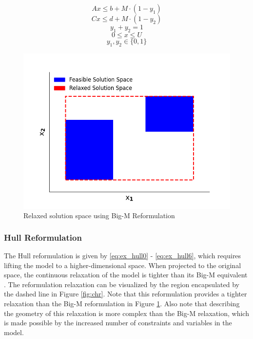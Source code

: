 \documentclass{juliacon}
\begin{document}
\begin{equation}
    \label{eq:ex_bigm1}
    Ax \leq b + M \cdot (1 - y_1)
\end{equation}
\begin{equation}
    \label{eq:ex_bigm2}
    Cx \leq d + M \cdot (1 - y_2)
\end{equation}
\begin{equation}
    \label{eq:ex_bigm3}
    y_1 + y_2 = 1
\end{equation}
\begin{equation}
    \label{eq:ex_bigm4}
    0 \leq x \leq U
\end{equation}
\begin{equation}
    \label{eq:ex_bigm5}
    y_1, y_2 \in \{0,1\}
\end{equation}

\begin{figure}
    \centering
    \includegraphics[scale=0.5]{bigm.png}
    \caption{Relaxed solution space using Big-M Reformulation}
    \label{fig:bigm}
\end{figure}

\subsubsection{Hull Reformulation}
The Hull reformulation is given by \eqref{eq:ex_hull0} - \eqref{eq:ex_hull6}, which requires lifting the model to a higher-dimensional space. When projected to the original space, the continuous relaxation of the model is tighter than its Big-M equivalent \cite{grossmann_trespalacios_2013}. The reformulation relaxation can be visualized by the region encapsulated by the dashed line in Figure \ref{fig:chr}. Note that this reformulation provides a tighter relaxation than the Big-M reformulation in Figure \ref{fig:bigm}. Also note that describing the geometry of this relaxation is more complex than the Big-M relaxation, which is made possible by the increased number of constraints and variables in the model.
\end{document}
